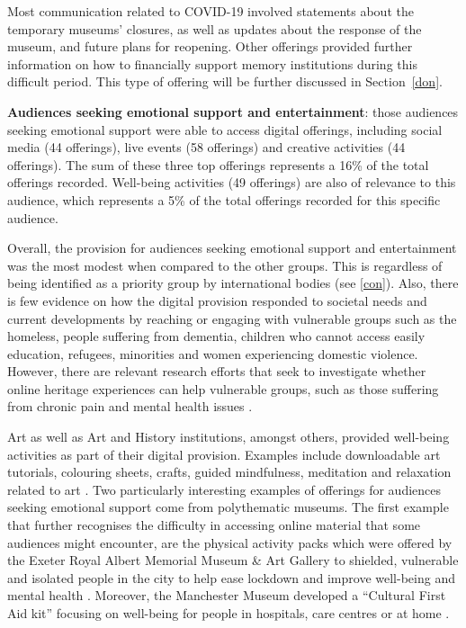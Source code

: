 \documentclass{egpubl}
\begin{document}
Most communication related to COVID-19 involved statements about the temporary museums' closures, as well as updates about the response of the museum, and future plans for reopening. Other offerings provided further information on how to financially support memory institutions during this difficult period. This type of offering will be further discussed in Section~\ref{don}.
 
\noindent \textbf{Audiences seeking emotional support and entertainment}: those audiences seeking emotional support were able to access digital offerings, including social media (44 offerings), live events (58 offerings) and creative activities (44 offerings). The sum of these three top offerings represents a 16\% of the total offerings recorded. Well-being activities (49 offerings) are also of relevance to this audience, which represents a 5\% of the total offerings recorded for this specific audience. 

Overall, the provision for audiences seeking emotional support and entertainment was the most modest when compared to the other groups. This is regardless of being identified as a priority group by international bodies (see \ref{con}). Also, there is few evidence on how the digital provision responded to societal needs and current developments by reaching or engaging with vulnerable groups such as the homeless, people suffering from dementia, children who cannot access easily education, refugees, minorities and women experiencing domestic violence. However, there are relevant research efforts that seek to investigate whether online heritage experiences can help vulnerable groups, such as those suffering from chronic pain and mental health issues \cite{O-Ace,CHWA}. 
 
Art as well as Art and History institutions, amongst others, provided well-being activities as part of their digital provision. Examples include downloadable art tutorials, colouring sheets, crafts, guided mindfulness, meditation and relaxation related to art \cite{VizcayaMuseumGardens2020,CrockerArtMuseum2020,Tate,IronbridgeGorgeMuseums2020}. Two particularly interesting examples of offerings for audiences seeking emotional support come from polythematic museums. The first example that further recognises the difficulty in accessing online material that some audiences might encounter, are the physical activity packs which were offered by the Exeter Royal Albert Memorial Museum \& Art Gallery to shielded, vulnerable and isolated people in the city to help ease lockdown and improve well-being and mental health \cite{Ex2020}. Moreover, the Manchester Museum developed a ``Cultural First Aid kit'' focusing on well-being for people in hospitals, care centres or at home \cite{Man2020}. 
\end{document}
